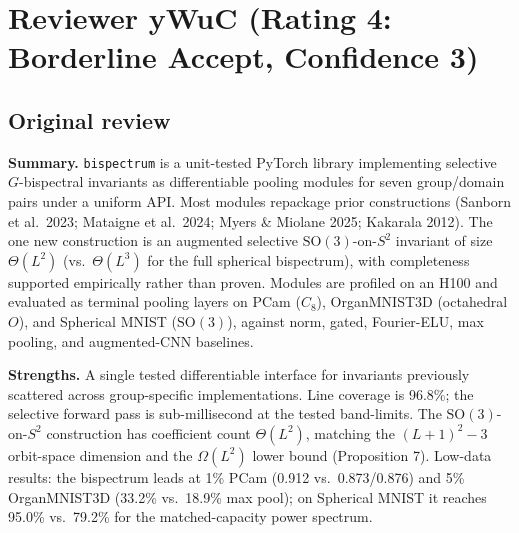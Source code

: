 \documentclass[10pt]{article}
\newenvironment{reviewquote}%
  {\par\medskip\begingroup\color{reviewgray}\small%
   \list{}{\leftmargin=1.5em\rightmargin=1.5em}\item\relax}%
  {\endlist\endgroup\par\medskip}
\begin{document}
\section{Reviewer yWuC (Rating 4: Borderline Accept, Confidence 3)}

\subsection{Original review}

\begin{reviewquote}
\textbf{Summary.} \texttt{bispectrum} is a unit-tested PyTorch library
implementing selective $G$-bispectral invariants as differentiable pooling
modules for seven group/domain pairs under a uniform API. Most modules
repackage prior constructions (Sanborn et al.\ 2023; Mataigne et al.\ 2024;
Myers \& Miolane 2025; Kakarala 2012). The one new construction is an
augmented selective $\mathrm{SO}(3)$-on-$S^2$ invariant of size $\Theta(L^2)$
(vs.\ $\Theta(L^3)$ for the full spherical bispectrum), with completeness supported
empirically rather than proven. Modules are profiled on an H100 and evaluated
as terminal pooling layers on PCam ($C_8$), OrganMNIST3D (octahedral $O$),
and Spherical MNIST ($\mathrm{SO}(3)$), against norm, gated, Fourier-ELU, max
pooling, and augmented-CNN baselines.

\textbf{Strengths.}
A single tested differentiable interface for invariants previously scattered
across group-specific implementations. Line coverage is 96.8\%; the selective
forward pass is sub-millisecond at the tested band-limits.
The $\mathrm{SO}(3)$-on-$S^2$ construction has coefficient count
$\Theta(L^2)$, matching the $(L+1)^2-3$ orbit-space dimension and the
$\Omega(L^2)$ lower bound (Proposition 7).
Low-data results: the bispectrum leads at 1\% PCam (0.912 vs.\ 0.873/0.876)
and 5\% OrganMNIST3D (33.2\% vs.\ 18.9\% max pool); on Spherical MNIST it
reaches 95.0\% vs.\ 79.2\% for the matched-capacity power spectrum.


\end{reviewquote}
\end{document}
